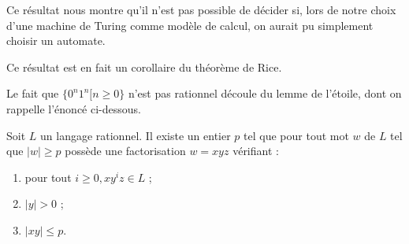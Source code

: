 \begin{rem}
Ce résultat nous montre qu'il n'est pas possible de décider si, lors de notre choix d'une machine de Turing comme modèle de calcul, on aurait pu simplement choisir un automate.
\end{rem}

\begin{rem}
Ce résultat est en fait un corollaire du théorème de Rice.
\end{rem}

\begin{rem}
Le fait que $\{0^n1^n[n\geq 0\}$ n'est pas rationnel découle du lemme de l'étoile, dont on rappelle l'énoncé ci-dessous.
\end{rem}

\begin{lemma}[de l'étoile]
Soit $L$ un langage rationnel. Il existe un entier $p$ tel que pour tout mot $w$ de $L$ tel que $|w|\geq p$ possède une factorisation $w=xyz$ vérifiant :
\begin{enumerate}
\item pour tout $i\geq 0, xy^iz\in L$ ;
\item $|y|>0$ ;
\item $|xy|\leq p$.
\end{enumerate}
\end{lemma}
